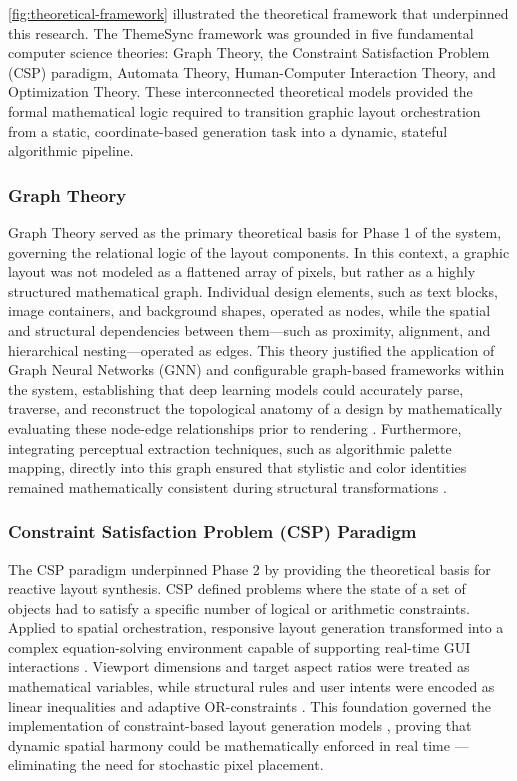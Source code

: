 \begin{refsection}
\ref{fig:theoretical-framework} illustrated the theoretical framework that underpinned this research. The ThemeSync framework was grounded in five fundamental computer science theories: Graph Theory, the Constraint Satisfaction Problem (CSP) paradigm, Automata Theory, Human-Computer Interaction Theory, and Optimization Theory. These interconnected theoretical models provided the formal mathematical logic required to transition graphic layout orchestration from a static, coordinate-based generation task into a dynamic, stateful algorithmic pipeline.

\subsubsection{Graph Theory}
Graph Theory served as the primary theoretical basis for Phase 1 of the system, governing the relational logic of the layout components. In this context, a graphic layout was not modeled as a flattened array of pixels, but rather as a highly structured mathematical graph. Individual design elements, such as text blocks, image containers, and background shapes, operated as nodes, while the spatial and structural dependencies between them—such as proximity, alignment, and hierarchical nesting—operated as edges. This theory justified the application of Graph Neural Networks (GNN) and configurable graph-based frameworks within the system, establishing that deep learning models could accurately parse, traverse, and reconstruct the topological anatomy of a design by mathematically evaluating these node-edge relationships prior to rendering \cite{Wu2022GNN}. Furthermore, integrating perceptual extraction techniques, such as algorithmic palette mapping, directly into this graph ensured that stylistic and color identities remained mathematically consistent during structural transformations \cite{Huang2025Recoloring}.

\subsubsection{Constraint Satisfaction Problem (CSP) Paradigm}
The CSP paradigm underpinned Phase 2 by providing the theoretical basis for reactive layout synthesis. CSP defined problems where the state of a set of objects had to satisfy a specific number of logical or arithmetic constraints. Applied to spatial orchestration, responsive layout generation transformed into a complex equation-solving environment capable of supporting real-time GUI interactions \cite{Lukes2021WebLayouts}. Viewport dimensions and target aspect ratios were treated as mathematical variables, while structural rules and user intents were encoded as linear inequalities and adaptive OR-constraints \cite{Jiang2020ORCSolver}. This foundation governed the implementation of constraint-based layout generation models \cite{Jiang2023LayoutFormer, Zhang2025Scalable}, proving that dynamic spatial harmony could be mathematically enforced in real time — eliminating the need for stochastic pixel placement.


\end{refsection}
